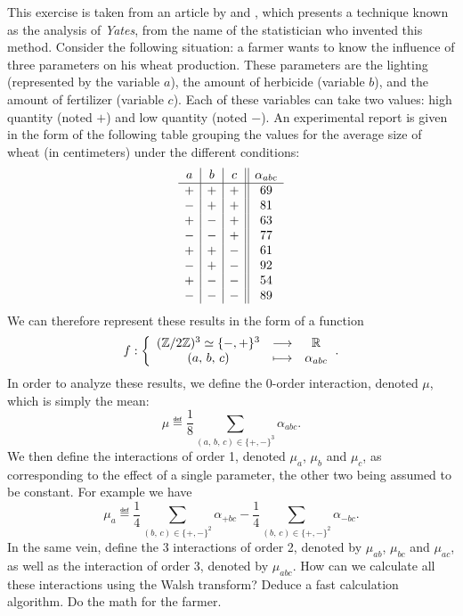  
\begin{exo}
\label{exo-transforme-walsh-statistic}
 
This exercise is taken from an article by  and , which presents a technique known as the analysis of \textit{Yates}, from the name of the statistician who invented this method. Consider the following situation: a farmer wants to know the influence of three parameters on his wheat production. These parameters are the lighting (represented by the variable $ a $), the amount of herbicide (variable $ b $), and the amount of fertilizer (variable $ c $). Each of these variables can take two values: high quantity (noted $ + $) and low quantity (noted $ - $). An experimental report is given in the form of the following table grouping the values for the average size of wheat (in centimeters) under the different conditions:
\begin{equation*}
\begin{array}{c | c | c || c} a & b & c & \alpha_{abc} \\\hline + & + & + & 69 \\- & + & + & 81 \\+ & - & + & 63 \\- & - & + & 77 \\+ & + & - & 61 \\- & + & - & 92 \\+ & - & - & 54 \\- & - & - & 89 \end{array}
\end{equation*}
We can therefore represent these results in the form of a function
\begin{equation*}
f: {\left\{ \begin{array}{ccc} (\mathbb{Z}/2 \mathbb{Z})^3 \simeq \{-, +\}^3 & \longrightarrow & \mathbb{R} \\ (a, \, b, \, c) & \longmapsto & \alpha_{abc}  \end{array} \right.}.
\end{equation*}
In order to analyze these results, we define the 0-order interaction, denoted $ \mu $, which is simply the mean:
\begin{equation*}
\mu \eqdef \frac{1}{8} \sum_{(a, \, b, \, c) \in \{+, -\}^3}{\alpha_{abc}}.
\end{equation*}
We then define the interactions of order 1, denoted $ \mu_a $, $ \mu_b $ and $ \mu_c $, as corresponding to the effect of a single parameter, the other two being assumed to be constant. For example we have
\begin{equation*}
\mu_{a} \eqdef \frac{1}{4} \sum_{(b, \, c) \in \{+, -\}^2}{\alpha_{+ bc}} - \frac{1 }{4} \sum_{(b, \, c) \in \{+, -\}^2}{\alpha_{- bc}}.
\end{equation*}
In the same vein, define the 3 interactions of order 2, denoted by $ \mu_{ab} $, $ \mu_{bc} $ and $ \mu_{ac} $, as well as the interaction of order 3, denoted by $ \mu_{abc} $. How can we calculate all these interactions using the Walsh transform? Deduce a fast calculation algorithm. Do the math for the farmer.
\end{exo}
 
